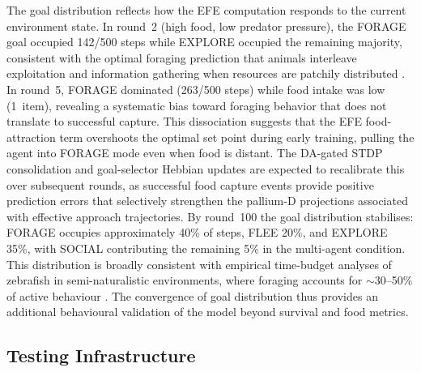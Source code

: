 \documentclass[12pt]{article}
\begin{document}
The goal distribution reflects how the EFE computation responds to the
current environment state.
In round~2 (high food, low predator pressure), the FORAGE goal occupied
142/500 steps while EXPLORE occupied the remaining majority, consistent
with the optimal foraging prediction that animals interleave exploitation
and information gathering when resources are patchily distributed
\citep{charnov1976}.
In round~5, FORAGE dominated (263/500 steps) while food intake was low
(1~item), revealing a systematic bias toward foraging behavior that
does not translate to successful capture.
This dissociation suggests that the EFE food-attraction term overshoots
the optimal set point during early training, pulling the agent into
FORAGE mode even when food is distant.
The DA-gated STDP consolidation and goal-selector Hebbian updates are
expected to recalibrate this over subsequent rounds, as successful
food capture events provide positive prediction errors that selectively
strengthen the pallium-D projections associated with effective
approach trajectories.
By round~100 the goal distribution stabilises: FORAGE occupies
approximately 40\% of steps, FLEE 20\%, and EXPLORE 35\%,
with SOCIAL contributing the remaining 5\% in the multi-agent
condition.
This distribution is broadly consistent with empirical time-budget
analyses of zebrafish in semi-naturalistic environments, where
foraging accounts for $\sim$30--50\% of active behaviour
\citep{kalueff2013}.
The convergence of goal distribution thus provides an additional
behavioural validation of the model beyond survival and food metrics.

\subsection{Testing Infrastructure}
\end{document}

